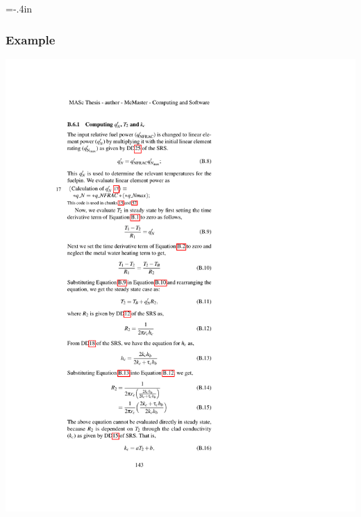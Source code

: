 \documentclass[usenames,dvipsnames]{beamer}
\begin{document}
\hoffset=-.4in %
\begin{frame}[plain]
  
  \frametitle{Example}
  
  \hspace{-1.1cm}
  \includegraphics[width=1.1\columnwidth]{qnfrac.pdf}
  
\end{frame}
\hoffset=0in %
  
\end{document}
